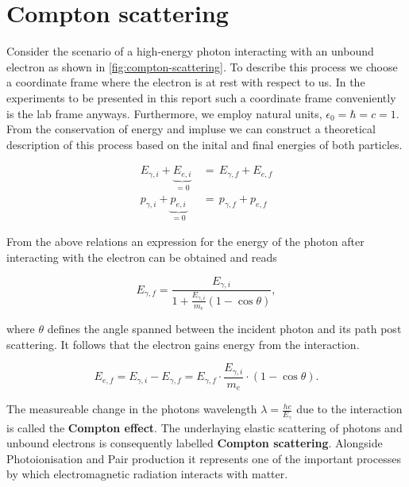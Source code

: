 
\section{Compton scattering}
\label{sec:compton-scattering}

Consider the scenario of a high-energy photon interacting with an unbound electron as
shown in \autoref{fig:compton-scattering}. To describe this process we choose a
coordinate frame where the electron is at rest with respect to us. In the experiments
to be presented in this report such a coordinate frame conveniently is the lab frame
anyways. Furthermore, we employ natural units, $\epsilon_0=\hbar=c=1$. \\
From the conservation of energy and impluse we can construct a theoretical
description of this process based on the inital and final energies of both particles.

\begin{align*}
E_{\gamma,i} + \underbrace{E_{e,i}}_{=0}\,&=\,E_{\gamma,f}+E_{e,f} \\
p_{\gamma,i} + \underbrace{p_{e,i}}_{=0}\,&=\,p_{\gamma,f}+p_{e,f}
\end{align*}

From the above relations an expression for the energy of the photon after interacting
with the electron can be obtained and reads

\begin{equation}
\label{eq:photon-energy}
E_{\gamma,f}=\frac{E_{\gamma,i}}{1+\frac{E_{\gamma,i}}{m_e}(1-\cos\theta)},
\end{equation}

where $\theta$ defines the angle spanned between the incident photon and its path
post scattering. It follows that the electron gains energy from the interaction.

\begin{equation}
\label{eq:electron-energy}
E_{e,f}=E_{\gamma,i}-E_{\gamma,f}=E_{\gamma,f}\cdot\frac{E_{\gamma,i}}{m_e}\cdot(1-\cos\theta).
\end{equation}

The measureable change in the photons wavelength $\lambda=\frac{hc}{E_{\gamma}}$
due to the interaction is called the \textbf{Compton effect}. The underlaying elastic
scattering of photons and unbound electrons is consequently labelled \textbf{Compton
scattering}. Alongside Photoionisation and Pair production it represents one of the
important processes by which electromagnetic radiation interacts with matter.

